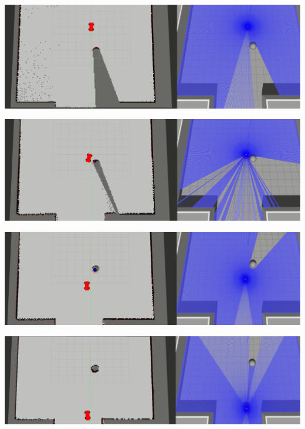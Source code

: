 \begin{minipage}{\textwidth}
    \includegraphics[width=\textwidth]{figures/raw/local_planner_test_straight_traj_static_obj_1.png}

    \vspace{0.5cm}
    \includegraphics[width=\textwidth]{figures/raw/local_planner_test_straight_traj_static_obj_2.png}

    \vspace{0.5cm}
    \includegraphics[width=\textwidth]{figures/raw/local_planner_test_straight_traj_static_obj_3.png}

    \vspace{0.5cm}
    \includegraphics[width=\textwidth]{figures/raw/local_planner_test_straight_traj_static_obj_4.png}

    \label{local_planner_test_straight_traj_static_obj}
\end{minipage}

